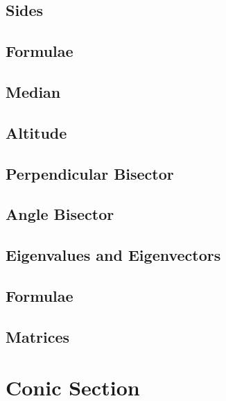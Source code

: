\documentclass[journal]{IEEEtran}
\begin{document}
\subsection{Sides}

\subsection{Formulae}

\subsection{Median}

\subsection{Altitude}

\subsection{Perpendicular Bisector}

\subsection{Angle Bisector}

\subsection{Eigenvalues and Eigenvectors}

\subsection{Formulae}

\subsection{Matrices}

\newpage
\section{Conic Section}

\fi
\end{document}
